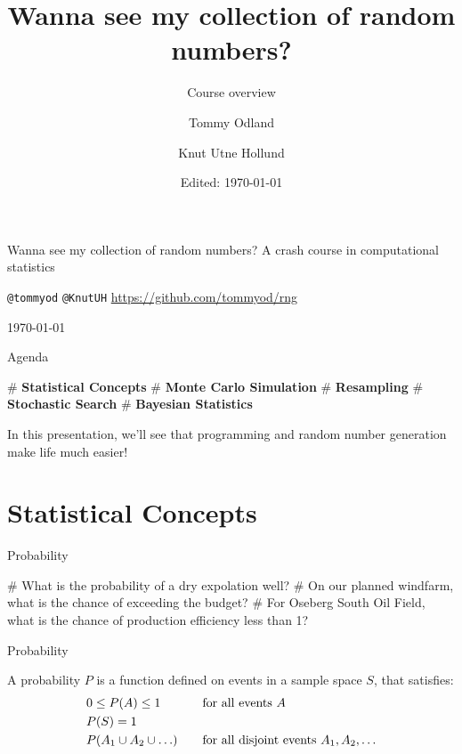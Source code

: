 \documentclass[12pt, aspectratio=149]{beamer}
\institute{Equinor}
\date{Edited: \today}
\author{Tommy Odland \and Knut Utne Hollund}
\title{Wanna see my collection of random numbers?}
\subtitle{Course overview}
\theoremstyle{plain}
\begin{document}
\begin{frame}{}
	\begin{center}
			\vfill
	{\huge Wanna see my collection of random numbers?}
	\vfill
	{\large A crash course in computational statistics}
	\vfill

	\vfill
	{\large  \texttt{@tommyod} \texttt{@KnutUH}}
	\vfill
	{\small \href{https://github.com/tommyod/rng}{https://github.com/tommyod/rng}}

	\vfill
	\today 
	\vfill
	\end{center}
\end{frame}

\begin{frame}[fragile]{Agenda}
	
	\begin{easylist}[itemize]
		# \textbf{Statistical Concepts} 
		# \textbf{Monte Carlo Simulation}
		# \textbf{Resampling}
		# \textbf{Stochastic Search} 
		# \textbf{Bayesian Statistics} 
	\end{easylist}
	\hspace{4em}

	In this presentation, we'll see that programming and random number generation make life much easier!
\end{frame}


\section{Statistical Concepts}

\begin{frame}[fragile]{Probability}
	
	\begin{easylist}[itemize]
		# What is the probability of a dry expolation well?
		# On our planned windfarm, what is the chance of exceeding the budget?
		# For Oseberg South Oil Field, what is the chance of production efficiency less than 1?
	\end{easylist}
\end{frame}

\begin{frame}[fragile]{Probability}

	A probability $P$ is a function defined on events in a sample space $S$, that satisfies:
	\begin{align*}
		& 0 \leq P(A) \leq 1  & & \text{for all events $A$} \\
		& P(S) = 1 & & \\
		& P(A_{1} \cup A_{2} \cup \ldots) & \hspace*{1em} & \text{for all disjoint events $A_{1}, A_{2}, \ldots$}	
	\end{align*}  
	
\end{frame}
\end{document}
